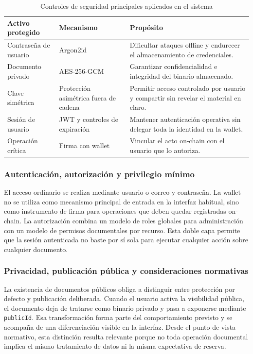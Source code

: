 \documentclass[11pt, a4paper]{article}
\begin{document}
\begin{table}[H]
    \centering
    \small
    \begin{tabular}{|p{3.6cm}|p{3.6cm}|p{5.9cm}|}
    \hline
    \textbf{Activo protegido} & \textbf{Mecanismo} & \textbf{Propósito} \\
    \hline
    Contraseña de usuario & Argon2id & Dificultar ataques offline y endurecer el almacenamiento de credenciales. \\
    \hline
    Documento privado & AES-256-GCM & Garantizar confidencialidad e integridad del binario almacenado. \\
    \hline
    Clave simétrica & Protección asimétrica fuera de cadena & Permitir acceso controlado por usuario y compartir sin revelar el material en claro. \\
    \hline
    Sesión de usuario & JWT y controles de expiración & Mantener autenticación operativa sin delegar toda la identidad en la wallet. \\
    \hline
    Operación crítica & Firma con wallet & Vincular el acto on-chain con el usuario que lo autoriza. \\
    \hline
    \end{tabular}
    \caption{Controles de seguridad principales aplicados en el sistema}
    \label{tab:controles-seguridad}
\end{table}

\subsubsection{Autenticación, autorización y privilegio mínimo}

El acceso ordinario se realiza mediante usuario o correo y contraseña. La wallet no se utiliza como mecanismo principal de entrada en la interfaz habitual, sino como instrumento de firma para operaciones que deben quedar registradas on-chain. La autorización combina un modelo de roles globales para administración con un modelo de permisos documentales por recurso. Esta doble capa permite que la sesión autenticada no baste por sí sola para ejecutar cualquier acción sobre cualquier documento.

\subsubsection{Privacidad, publicación pública y consideraciones normativas}

La existencia de documentos públicos obliga a distinguir entre protección por defecto y publicación deliberada. Cuando el usuario activa la visibilidad pública, el documento deja de tratarse como binario privado y pasa a exponerse mediante \texttt{publicId}. Esa transformación forma parte del comportamiento previsto y se acompaña de una diferenciación visible en la interfaz. Desde el punto de vista normativo, esta distinción resulta relevante porque no toda operación documental implica el mismo tratamiento de datos ni la misma expectativa de reserva.
\end{document}
